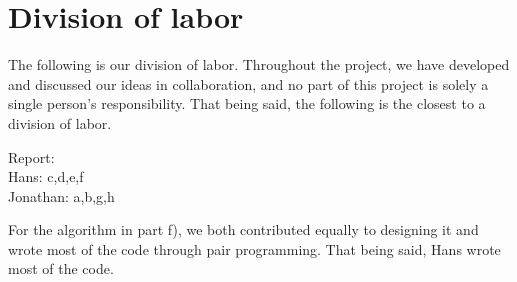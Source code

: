 \section*{Division of labor}

The following is our division of labor. Throughout the project, we have developed and discussed our ideas in collaboration, and no part of this project is solely a single person's responsibility. That being said, the following is the closest to a division of labor. 

Report: \\
Hans: c,d,e,f \\
Jonathan: a,b,g,h

For the algorithm in part f), we both contributed equally to designing it and wrote most of the code through pair programming. That being said, Hans wrote most of the code. 
